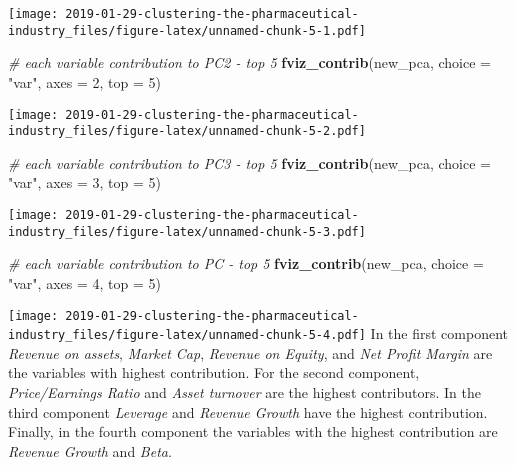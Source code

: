 \documentclass[]{article}
\newenvironment{Shaded}{\begin{snugshade}}{\end{snugshade}}
\newcommand{\KeywordTok}[1]{\textcolor[rgb]{0.13,0.29,0.53}{\textbf{#1}}}
\newcommand{\DataTypeTok}[1]{\textcolor[rgb]{0.13,0.29,0.53}{#1}}
\newcommand{\DecValTok}[1]{\textcolor[rgb]{0.00,0.00,0.81}{#1}}
\newcommand{\StringTok}[1]{\textcolor[rgb]{0.31,0.60,0.02}{#1}}
\newcommand{\CommentTok}[1]{\textcolor[rgb]{0.56,0.35,0.01}{\textit{#1}}}
\newcommand{\NormalTok}[1]{#1}
\begin{document}
\texttt{[image: 2019-01-29-clustering-the-pharmaceutical-industry\_files/figure-latex/unnamed-chunk-5-1.pdf]}

\begin{Shaded}
\begin{Highlighting}[]
\CommentTok{# each variable contribution to PC2 - top 5}
\KeywordTok{fviz_contrib}\NormalTok{(new_pca, }\DataTypeTok{choice =} \StringTok{"var"}\NormalTok{, }\DataTypeTok{axes =} \DecValTok{2}\NormalTok{, }\DataTypeTok{top =} \DecValTok{5}\NormalTok{)}
\end{Highlighting}
\end{Shaded}

\texttt{[image: 2019-01-29-clustering-the-pharmaceutical-industry\_files/figure-latex/unnamed-chunk-5-2.pdf]}

\begin{Shaded}
\begin{Highlighting}[]
\CommentTok{# each variable contribution to PC3 - top 5}
\KeywordTok{fviz_contrib}\NormalTok{(new_pca, }\DataTypeTok{choice =} \StringTok{"var"}\NormalTok{, }\DataTypeTok{axes =} \DecValTok{3}\NormalTok{, }\DataTypeTok{top =} \DecValTok{5}\NormalTok{)}
\end{Highlighting}
\end{Shaded}

\texttt{[image: 2019-01-29-clustering-the-pharmaceutical-industry\_files/figure-latex/unnamed-chunk-5-3.pdf]}

\begin{Shaded}
\begin{Highlighting}[]
\CommentTok{# each variable contribution to PC - top 5}
\KeywordTok{fviz_contrib}\NormalTok{(new_pca, }\DataTypeTok{choice =} \StringTok{"var"}\NormalTok{, }\DataTypeTok{axes =} \DecValTok{4}\NormalTok{, }\DataTypeTok{top =} \DecValTok{5}\NormalTok{)}
\end{Highlighting}
\end{Shaded}

\texttt{[image: 2019-01-29-clustering-the-pharmaceutical-industry\_files/figure-latex/unnamed-chunk-5-4.pdf]}
In the first component \emph{Revenue on assets}, \emph{Market Cap},
\emph{Revenue on Equity}, and \emph{Net Profit Margin} are the variables
with highest contribution. For the second component,
\emph{Price/Earnings Ratio} and \emph{Asset turnover} are the highest
contributors. In the third component \emph{Leverage} and \emph{Revenue
Growth} have the highest contribution. Finally, in the fourth component
the variables with the highest contribution are \emph{Revenue Growth}
and \emph{Beta}.
\end{document}
